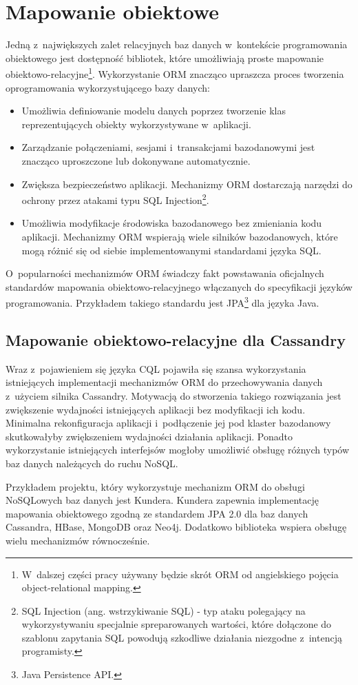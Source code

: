 
\chapter{Mapowanie obiektowe}

Jedną z~największych zalet relacyjnych baz danych w~kontekście programowania obiektowego jest dostępność bibliotek, które umożliwiają proste mapowanie obiektowo-relacyjne\footnote{W~dalszej części pracy używany będzie skrót ORM od angielskiego pojęcia object-relational mapping.}. Wykorzystanie ORM znacząco upraszcza proces tworzenia oprogramowania wykorzystującego bazy danych:

\begin{itemize}
	\item Umożliwia definiowanie modelu danych poprzez tworzenie klas reprezentujących obiekty wykorzystywane w~aplikacji.
	\item Zarządzanie połączeniami, sesjami i~transakcjami bazodanowymi jest znacząco uproszczone lub dokonywane automatycznie.
	\item Zwiększa bezpieczeństwo aplikacji. Mechanizmy ORM dostarczają narzędzi do ochrony przez atakami typu SQL Injection\footnote{SQL Injection (ang. wstrzykiwanie SQL) - typ ataku polegający na wykorzystywaniu specjalnie spreparowanych wartości, które dołączone do szablonu zapytania SQL powodują szkodliwe działania niezgodne z~intencją programisty.}.~\cite{orm_sql_injection_protection}
	\item Umożliwia modyfikacje środowiska bazodanowego bez zmieniania kodu aplikacji. Mechanizmy ORM wspierają wiele silników bazodanowych, które mogą różnić się od siebie implementowanymi standardami języka SQL. 
\end{itemize}

O~popularności mechanizmów ORM świadczy fakt powstawania oficjalnych standardów mapowania obiektowo-relacyjnego włączanych do specyfikacji języków programowania. Przykładem takiego standardu jest JPA\footnote{Java Persistence API.} dla języka Java.

\section{Mapowanie obiektowo-relacyjne dla Cassandry}

Wraz z~pojawieniem się języka CQL pojawiła się szansa wykorzystania istniejących implementacji mechanizmów ORM do przechowywania danych z~użyciem silnika Cassandry. Motywacją do stworzenia takiego rozwiązania jest zwiększenie wydajności istniejących aplikacji bez modyfikacji ich kodu. Minimalna rekonfiguracja aplikacji i~podłączenie jej pod klaster bazodanowy skutkowałyby zwiększeniem wydajności działania aplikacji. Ponadto wykorzystanie istniejących interfejsów mogłoby umożliwić obsługę różnych typów baz danych należących do ruchu NoSQL. 

Przykładem projektu, który wykorzystuje mechanizm ORM do obsługi NoSQLowych baz danych jest Kundera.\cite{kundera_home} Kundera zapewnia implementację mapowania obiektowego zgodną ze standardem JPA 2.0 dla baz danych Cassandra, HBase, MongoDB oraz Neo4j. Dodatkowo biblioteka wspiera obsługę wielu mechanizmów równocześnie.


